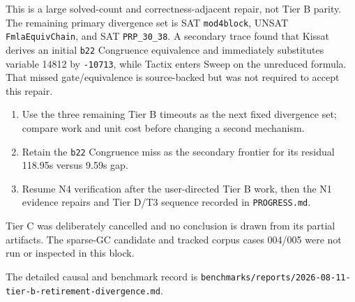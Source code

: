 \documentclass[11pt]{article}
\newcommand{\code}[1]{\nolinkurl{#1}}
\newcommand{\tactix}{Tactix}
\newcommand{\kissat}{Kissat}
\begin{document}
This is a large solved-count and correctness-adjacent repair, not Tier B
parity. The remaining primary divergence set is SAT \code{mod4block}, UNSAT
\code{FmlaEquivChain}, and SAT \code{PRP_30_38}. A secondary trace found that
\kissat{} derives an initial \code{b22} Congruence equivalence and immediately
substitutes variable 14812 by \code{-10713}, while \tactix{} enters Sweep on
the unreduced formula. That missed gate/equivalence is source-backed but was
not required to accept this repair.

\begin{enumerate}[leftmargin=*]
  \item Use the three remaining Tier B timeouts as the next fixed divergence
        set; compare work and unit cost before changing a second mechanism.
  \item Retain the \code{b22} Congruence miss as the secondary frontier for its
        residual 118.95s versus 9.59s gap.
  \item Resume N4 verification after the user-directed Tier B work, then the
        N1 evidence repairs and Tier D/T3 sequence recorded in \code{PROGRESS.md}.
\end{enumerate}

Tier C was deliberately cancelled and no conclusion is drawn from its partial
artifacts. The sparse-GC candidate and tracked corpus cases 004/005 were not
run or inspected in this block.

The detailed causal and benchmark record is
\code{benchmarks/reports/2026-08-11-tier-b-retirement-divergence.md}.
\end{document}
